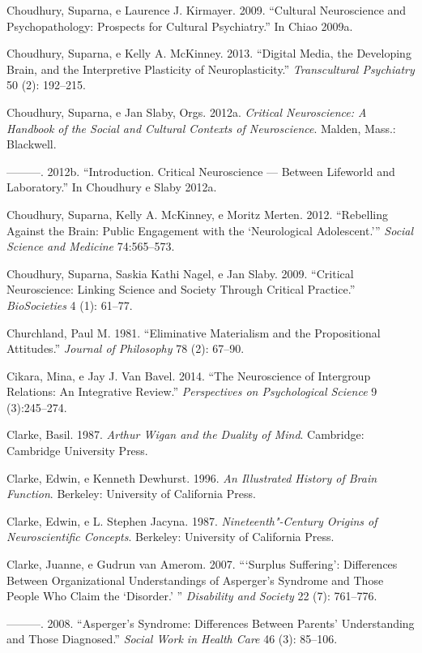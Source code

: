 Choudhury, Suparna, e Laurence J. Kirmayer. 2009. ``Cultural
Neuroscience and Psychopathology: Prospects for Cultural Psychiatry.''
In Chiao 2009a.

Choudhury, Suparna, e Kelly A. McKinney. 2013. ``Digital Media, the
Developing Brain, and the Interpretive Plasticity of Neuroplasticity.''
\emph{Transcultural Psychiatry} 50 (2): 192--215.

Choudhury, Suparna, e Jan Slaby, Orgs. 2012a. \emph{Critical
Neuroscience: A Handbook of the Social and Cultural Contexts of
Neuroscience}. Malden, Mass.: Blackwell.

---------. 2012b. ``Introduction. Critical Neuroscience --- Between
Lifeworld and Laboratory.'' In Choudhury e Slaby 2012a.

Choudhury, Suparna, Kelly A. McKinney, e Moritz Merten. 2012.
``Rebelling Against the Brain: Public Engagement with the `Neurological
Adolescent.''' \emph{Social Science and Medicine} 74:565--573.

Choudhury, Suparna, Saskia Kathi Nagel, e Jan Slaby. 2009. ``Critical
Neuroscience: Linking Science and Society Through Critical Practice.''
\emph{BioSocieties} 4 (1): 61--77.

Churchland, Paul M. 1981. ``Eliminative Materialism and the
Propositional Attitudes.'' \emph{Journal of Philosophy} 78 (2): 67--90.

Cikara, Mina, e Jay J. Van Bavel. 2014. ``The Neuroscience of Intergroup
Relations: An Integrative Review.'' \emph{Perspectives on Psychological
Science} 9 (3):245--274.

Clarke, Basil. 1987. \emph{Arthur Wigan and the Duality of Mind}.
Cambridge: Cambridge University Press.

Clarke, Edwin, e Kenneth Dewhurst. 1996. \emph{An Illustrated History of
Brain Function}. Berkeley: University of California Press.

Clarke, Edwin, e L. Stephen Jacyna. 1987. \emph{Nineteenth"-Century
Origins of Neuroscientific Concepts}. Berkeley: University of California
Press.

Clarke, Juanne, e Gudrun van Amerom. 2007. ```Surplus Suffering':
Differences Between Organizational Understandings of Asperger's Syndrome
and Those People Who Claim the `Disorder.' '' \emph{Disability and
Society} 22 (7): 761--776.

---------. 2008. ``Asperger's Syndrome: Differences Between Parents'
Understanding and Those Diagnosed.'' \emph{Social Work in Health Care}
46 (3): 85--106.

